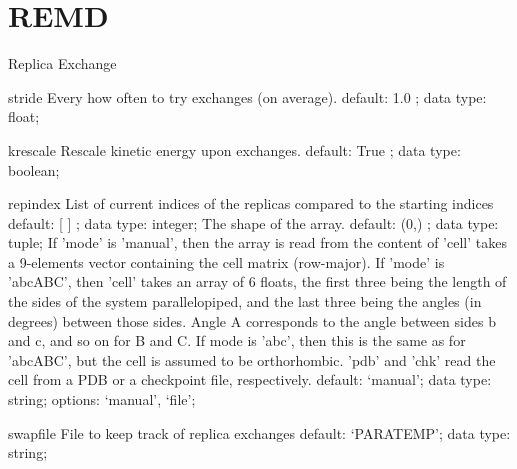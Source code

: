 \section{REMD}
\label{REMD}
\begin{ipifield}{}%
{Replica Exchange}%
{}%
{}
\begin{ipifield}{stride}%
{Every how often to try exchanges (on average).}%
{default:  1.0 ; data type: float; }%
{}
\end{ipifield}
\begin{ipifield}{krescale}%
{Rescale kinetic energy upon exchanges.}%
{default:  True ; data type: boolean; }%
{}
\end{ipifield}
\begin{ipifield}{repindex}%
{List of current indices of the replicas compared to the starting indices}%
{default:  [ ] ; data type: integer; }%
{%
{The shape of the array.}%
{default:  (0,) ; data type: tuple; }%
%
{If 'mode' is 'manual', then the array is read from the content of 'cell' takes a 9-elements vector containing the cell matrix (row-major). If 'mode' is 'abcABC', then 'cell' takes an array of 6 floats, the first three being the length of the sides of the system parallelopiped, and the last three being the angles (in degrees) between those sides. Angle A corresponds to the angle between sides b and c, and so on for B and C. If mode is 'abc', then this is the same as for 'abcABC', but the cell is assumed to be orthorhombic. 'pdb' and 'chk' read the cell from a PDB or a checkpoint file, respectively.}%
{default: `manual'; data type: string; options: `manual', `file'; }%
}
\end{ipifield}
\begin{ipifield}{swapfile}%
{File to keep track of replica exchanges}%
{default: `PARATEMP'; data type: string; }%
{}
\end{ipifield}
\end{ipifield}
